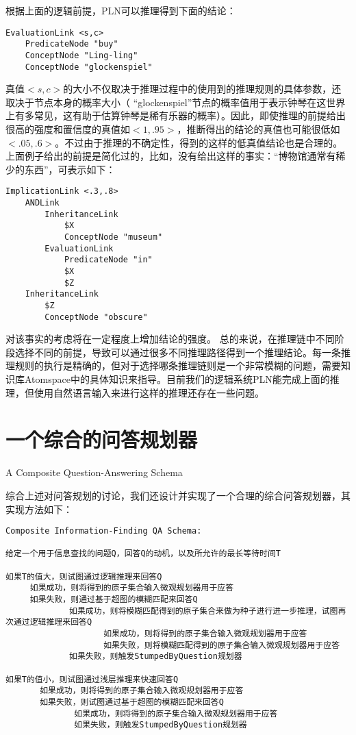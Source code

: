 根据上面的逻辑前提，PLN可以推理得到下面的结论：

\begin{verbatim}
EvaluationLink <s,c>
	PredicateNode "buy"
	ConceptNode "Ling-ling"
	ConceptNode "glockenspiel"
\end{verbatim}

真值$<s,c>$的大小不仅取决于推理过程中的使用到的推理规则的具体参数，还取决于节点本身的概率大小（ “glockenspiel”节点的概率值用于表示钟琴在这世界上有多常见，这有助于估算钟琴是稀有乐器的概率）。因此，即使推理的前提给出很高的强度和置信度的真值如$<1,.95>$，推断得出的结论的真值也可能很低如$<.05,.6>$。不过由于推理的不确定性，得到的这样的低真值结论也是合理的。
上面例子给出的前提是简化过的，比如，没有给出这样的事实：“博物馆通常有稀少的东西”，可表示如下：

\begin{verbatim}
ImplicationLink <.3,.8>
	ANDLink
		InheritanceLink
			$X
			ConceptNode "museum"
		EvaluationLink
			PredicateNode "in"
			$X
			$Z
	InheritanceLink
		$Z
		ConceptNode "obscure"
\end{verbatim}

对该事实的考虑将在一定程度上增加结论的强度。
总的来说，在推理链中不同阶段选择不同的前提，导致可以通过很多不同推理路径得到一个推理结论。每一条推理规则的执行是精确的，但对于选择哪条推理链则是一个非常模糊的问题，需要知识库Atomspace中的具体知识来指导。目前我们的逻辑系统PLN能完成上面的推理，但使用自然语言输入来进行这样的推理还存在一些问题。


\section{一个综合的问答规划器}{A Composite Question-Answering Schema}

综合上述对问答规划的讨论，我们还设计并实现了一个合理的综合问答规划器，其实现方法如下：

\begin{verbatim}
Composite Information-Finding QA Schema:

给定一个用于信息查找的问题Q，回答Q的动机，以及所允许的最长等待时间T

如果T的值大，则试图通过逻辑推理来回答Q
     如果成功，则将得到的原子集合输入微观规划器用于应答
     如果失败，则通过基于超图的模糊匹配来回答Q
             如果成功，则将模糊匹配得到的原子集合来做为种子进行进一步推理，试图再次通过逻辑推理来回答Q
                    如果成功，则将得到的原子集合输入微观规划器用于应答
                    如果失败，则将模糊匹配得到的原子集合输入微观规划器用于应答
             如果失败，则触发StumpedByQuestion规划器
     
如果T的值小，则试图通过浅层推理来快速回答Q
       如果成功，则将得到的原子集合输入微观规划器用于应答
       如果失败，则试图通过基于超图的模糊匹配来回答Q
              如果成功，则将得到的原子集合输入微观规划器用于应答
              如果失败，则触发StumpedByQuestion规划器

\end{verbatim}

